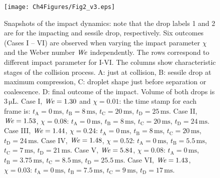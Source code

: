 \begin{figure}
	\centering
	\texttt{[image: Ch4Figures/Fig2\_v3.eps]}
	\caption{Snapshots of the impact dynamics: note that the drop labels 1 and 2 are for the impacting and sessile drop, respectively. Six outcomes (Cases I – VI) are observed when varying the impact parameter $\chi$ and the Weber number $\mathit{We}$ independently. The rows correspond to different impact parameter for I-VI. The columns show characteristic stages of the collision process. A: just at collision, B: sessile drop at maximum compression, C: droplet shape just before separation or coalescence. D: final outcome of the impact. Volume of both drops is $3\,\si{\micro\liter}$. Case I, $\mathit{We} = 1.30$ and $\chi = 0.01$: the time stamp for each frame is: $t_{\text{A}} = 0\,\si{\milli\second}$, $t_{\text{B}} = 8\,\si{\milli\second}$, $t_{\text{C}} = 20\,\si{\milli\second}$, $t_{\text{D}} = 25\,\si{\milli\second}$. Case II, $\mathit{We} = 1.53$, $\chi = 0.08$: $t_{\text{A}} = 0\,\si{\milli\second}$, $t_{\text{B}} = 8\,\si{\milli\second}$, $t_{\text{C}} =20\,\si{\milli\second}$, $t_{\text{D}} = 24\,\si{\milli\second}$.  Case III, $\mathit{We} = 1.44$, $\chi = 0.24$: $t_{\text{A}} = 0\,\si{\milli\second}$, $t_{\text{B}} = 8\,\si{\milli\second}$, $t_{\text{C}} = 20\,\si{\milli\second}$, $t_{\text{D}} = 24\,\si{\milli\second}$. Case IV, $\mathit{We} = 1.48$, $\chi = 0.52$: $t_{\text{A}} = 0\,\si{\milli\second}$, $t_{\text{B}} = 5.5\,\si{\milli\second}$, $t_{\text{C}} = 7\,\si{\milli\second}$, $t_{\text{D}} = 21\,\si{\milli\second}$. Case V, $\mathit{We} = 5.84$, $\chi = 0.08$: $t_{\text{A}} = 0\,\si{\milli\second}$, $t_{\text{B}} = 3.75\,\si{\milli\second}$, $t_{\text{C}} = 8.5\,\si{\milli\second}$, $t_{\text{D}} = 25.5\,\si{\milli\second}$. Case VI, $\mathit{We} = 1.43$, $\chi = 0.03$: $t_{\text{A}} = 0\,\si{\milli\second}$, $t_{\text{B}} = 7.5\,\si{\milli\second}$, $t_{\text{C}} = 9\,\si{\milli\second}$, $t_{\text{D}} = 17\,\si{\milli\second}$.}
	\label{ChDoD:fig2}
\end{figure}

